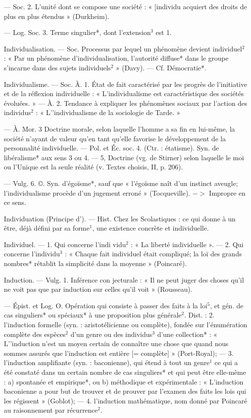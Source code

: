 — Soc. 2. L'unité dont se compose une société : « [individu
acquiert des droits de plus en plus
étendus » (Durkheim).

— Log. Soc. 3. Terme singulier*, dont l’extension$^3$ est 1.

Individualisation. — Soc. Processus
par lequel un phénomène devient
individuel$^2$ : « Par un phénomène
d’individualisation, l'autorité diffuse* dans le groupe s’incarne dans
des sujets individuels$^2$ » (Davy). —
Cf. Démocratie*.

Individualisme. — Soc. À. 1. État de
fait caractérisé par les progrès de
l'initiative et de la réflexion individuelle : « L’individualisme est
caractéristique des sociétés évoluées. » — À. 2. Tendance à expliquer les phénomènes sociaux par
l'action des individus$^2$ : « L'’individualisme de la sociologie de Tarde. »

— À. Mor. 3 Doctrine morale,
selon laquelle l’homme a sa fin en
lui-même, la société n'ayant de valeur qu’en tant qu’elle favorise le
développement de la personnalité
individuelle. — Pol. et Éc. soc.
4. (Ctr. : étatisme). Syn. de libéralisme* aux sens 3 ou 4. — 5, Doctrine (vg. de Stirner) selon laquelle
le moi ou l’Unique est la seule réalité
(v. Textes choisis, II, p. 206).

— Vulg. 6. ©. Syn. d’égoïsme*,
sauf que « l’égoïsme naît d’un instinct aveugle; l’individualisme procède d’un jugement erroné » (Tocqueville). $->$ Impropre en ce sens.

Individuation (Principe d’). — Hist.
Chez les Scolastiques : ce qui donne
à un être, déjà défini par sa forme$^1$,
une existence concrète et individuelle.

Individuel. — 1. Qui concerne l'indi
vidu$^2$ : « La liberté individuelle ». —
2. Qui concerne l’individu$^3$ : « Chaque
fait individuel était compliqué; la
loï des grands nombres* rétablit la
simplicité dans la moyenne » (Poincaré).

Induction. — Vulg. 1. Inférence con
jecturale : « Il ne peut juger des
choses qu’il ne voit pas que par
induction sur celles qu'il voit »
(Rousseau).

— Épist. et Log. O. Opération
qui consiste à passer des faits à la
loi$^5$, et gén. de cas singuliers* ou
spéciaux* à une proposition plus
générale$^2$. Dist. : 2. l'induction formelle (syn. : aristotélicienne ou complète), fondée sur l’énumération
complète des espèces$^2$ d’un genre
ou des individus$^3$ d’une collection* :
« L'’induction n’est un moyen certain de connaître une chose que
quand nous sommes assurés que
l'induction est entière [= complète] » (Port-Royal); — 3. l’induction amplifiante (syn. : baconienne),
qui étend à tout un genre$^1$ ce qui a
été constaté dans un certain nombre
de cas singuliers* et qui peut être
elle-même : a) spontanée et empirique*, ou b) méthodique et expérimentale : « L’induction baconienne a pour but de trouver et de
prouver par l’examen des faits les
lois qui les régissent » (Goblot); —
4. l'induction mathématique, nom
donné par Poincaré au raisonnement par récurrence$^2$.

